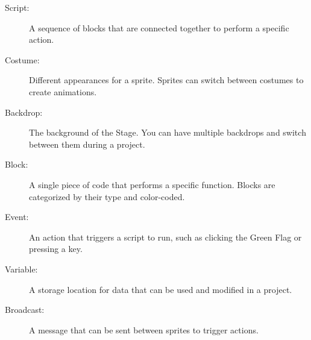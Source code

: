 \documentclass[main.tex:]{subfiles}
\begin{document}
  \begin{description}
    \item[Script:] A sequence of blocks that are connected together to perform a specific action.
    \item[Costume:] Different appearances for a sprite. Sprites can switch between costumes to create animations.
    \item[Backdrop:] The background of the Stage. You can have multiple backdrops and switch between them during a project.
    \item[Block:] A single piece of code that performs a specific function. Blocks are categorized by their type and color-coded.
    \item[Event:] An action that triggers a script to run, such as clicking the Green Flag or pressing a key.
    \item[Variable:] A storage location for data that can be used and modified in a project.
    \item[Broadcast:] A message that can be sent between sprites to trigger actions.
  \end{description}
\end{document}
